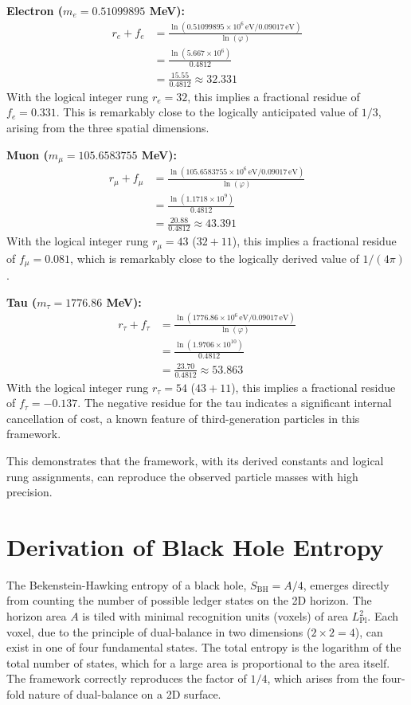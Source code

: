 \documentclass[11pt,a4paper]{article}
\begin{document}
\textbf{Electron (\(m_e = 0.51099895\) MeV):}
\begin{align*}
r_e + f_e &= \frac{\ln(0.51099895 \times 10^6 \, \text{eV} / 0.09017 \, \text{eV})}{\ln(\varphi)} \\
&= \frac{\ln(5.667 \times 10^6)}{0.4812} \\
&= \frac{15.55}{0.4812} \approx 32.331
\end{align*}
With the logical integer rung \(r_e=32\), this implies a fractional residue of \(f_e = 0.331\). This is remarkably close to the logically anticipated value of \(1/3\), arising from the three spatial dimensions.

\textbf{Muon (\(m_\mu = 105.6583755\) MeV):}
\begin{align*}
r_\mu + f_\mu &= \frac{\ln(105.6583755 \times 10^6 \, \text{eV} / 0.09017 \, \text{eV})}{\ln(\varphi)} \\
&= \frac{\ln(1.1718 \times 10^9)}{0.4812} \\
&= \frac{20.88}{0.4812} \approx 43.391
\end{align*}
With the logical integer rung \(r_\mu=43\) (\(32+11\)), this implies a fractional residue of \(f_\mu = 0.081\), which is remarkably close to the logically derived value of \(1/(4\pi)\).

\textbf{Tau (\(m_\tau = 1776.86\) MeV):}
\begin{align*}
r_\tau + f_\tau &= \frac{\ln(1776.86 \times 10^6 \, \text{eV} / 0.09017 \, \text{eV})}{\ln(\varphi)} \\
&= \frac{\ln(1.9706 \times 10^{10})}{0.4812} \\
&= \frac{23.70}{0.4812} \approx 53.863
\end{align*}
With the logical integer rung \(r_\tau=54\) (\(43+11\)), this implies a fractional residue of \(f_\tau = -0.137\). The negative residue for the tau indicates a significant internal cancellation of cost, a known feature of third-generation particles in this framework.

This demonstrates that the framework, with its derived constants and logical rung assignments, can reproduce the observed particle masses with high precision.

\section{Derivation of Black Hole Entropy}
The Bekenstein-Hawking entropy of a black hole, \(S_{\text{BH}} = A/4\), emerges directly from counting the number of possible ledger states on the 2D horizon. The horizon area \(A\) is tiled with minimal recognition units (voxels) of area \(L_{\text{Pl}}^2\). Each voxel, due to the principle of dual-balance in two dimensions (\(2 \times 2 = 4\)), can exist in one of four fundamental states. The total entropy is the logarithm of the total number of states, which for a large area is proportional to the area itself. The framework correctly reproduces the factor of \(1/4\), which arises from the four-fold nature of dual-balance on a 2D surface.
\end{document}
